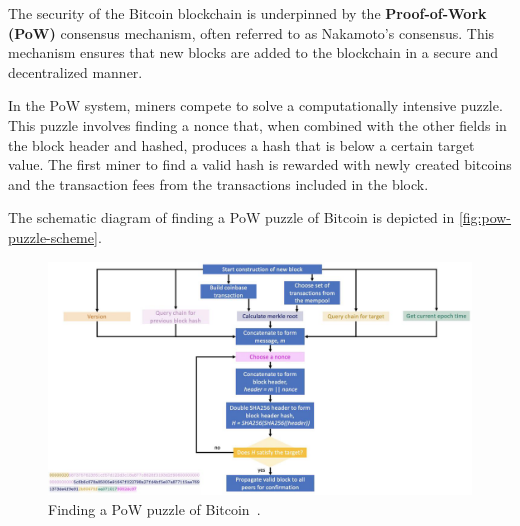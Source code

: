 The security of the Bitcoin blockchain is underpinned by the
\textbf{Proof-of-Work (PoW)} consensus mechanism, often referred to as
Nakamoto's consensus. This mechanism ensures that new blocks are added
to the blockchain in a secure and decentralized manner.

In the PoW system, miners compete to solve a computationally intensive
puzzle. This puzzle involves finding a nonce that, when combined with
the other fields in the block header and hashed, produces a hash that is
below a certain target value. The first miner to find a valid hash is
rewarded with newly created bitcoins and the transaction fees from the
transactions included in the block.

The schematic diagram of finding a PoW puzzle of Bitcoin is depicted in \autoref{fig:pow-puzzle-scheme}.
\begin{figure}[t]
	\begin{center}
		\includegraphics[width=1.1\textwidth]{./figs/pow-scheme.png}
		\caption{Finding a PoW puzzle of Bitcoin~.}		
		\label{fig:pow-puzzle-scheme}
	\end{center}	
\end{figure}

